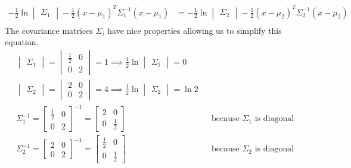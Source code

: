 \documentclass[a4paper, 10pt, twoside]{article}
\begin{document}
\begin{enumerate}[a)]
\begin{align*}
              - \frac{1}{2} \ln \begin{vmatrix}\Sigma_1\end{vmatrix} - \frac{1}{2}(x-\mu_1)^T \Sigma_1^{-1}(x-\mu_1)                       & = - \frac{1}{2} \ln \begin{vmatrix}\Sigma_2\end{vmatrix} - \frac{1}{2}(x-\mu_2)^T \Sigma_2^{-1}(x-\mu_2)                       \\
          \end{align*}
          The covariance matrices $\Sigma_i$ have nice properties allowing us to simplify this equation.
          \begin{align}
              \begin{vmatrix}\Sigma_1\end{vmatrix} = \begin{vmatrix}\frac{1}{2} & 0 \\ 0 & 2\end{vmatrix} = 1 \implies \frac{1}{2} \ln \begin{vmatrix}\Sigma_1\end{vmatrix} = 0            \\
              \begin{vmatrix}\Sigma_2\end{vmatrix} = \begin{vmatrix}2 & 0 \\ 0 & 2\end{vmatrix} = 4 \implies \frac{1}{2} \ln \begin{vmatrix}\Sigma_2\end{vmatrix} = \ln 2        \\
              \Sigma_1^{-1} = \begin{bmatrix}\frac{1}{2} & 0 \\ 0 & 2\end{bmatrix}^{-1} = \begin{bmatrix}2 & 0 \\ 0 & \frac{1}{2}\end{bmatrix} &  & \text{because } \Sigma_1 \text{ is diagonal} \\
              \Sigma_2^{-1} = \begin{bmatrix}2 & 0 \\ 0 & 2\end{bmatrix}^{-1} = \begin{bmatrix}\frac{1}{2} & 0 \\ 0 & \frac{1}{2}\end{bmatrix} &  & \text{because } \Sigma_2 \text{ is diagonal}

\end{align}
\end{enumerate}
\end{document}
